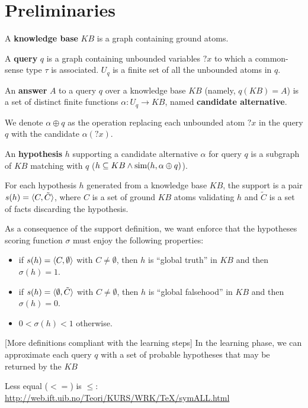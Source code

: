 \section{Preliminaries}
\begin{definition}
A \textbf{knowledge base} $KB$ is a graph containing ground atoms.
\end{definition}
\medskip

\begin{definition}[Query]
A \textbf{query} $q$ is a graph containing unbounded variables $?x$ to which a common-sense type $\tau$ is associated. $U_q$ is a finite set of all the unbounded atoms in $q$.
\end{definition}
\medskip

\begin{definition}[Answer]
An \textbf{answer} $A$ to a query $q$ over a knowledge base $KB$ (namely, $q(KB)=A$) is a set of distinct finite functions $\alpha:U_q\to KB$, named \textbf{candidate alternative}.

We denote $\alpha\oplus q$ as the operation replacing each unbounded atom $?x$ in the query $q$ with the candidate $\alpha(?x)$.
\end{definition}
\medskip

\begin{definition}[Hypothesis]
An \textbf{hypothesis} $h$ supporting a candidate alternative $\alpha$ for query $q$ is a subgraph of $KB$ matching with $q$ ($ h\subseteq KB\wedge \textup{sim}(h,\alpha\oplus q)$).
\end{definition}
\medskip

\begin{definition}[Support]
For each hypothesis $h$ generated from a knowledge base $KB$, the support is a pair $s(h)=\braket{C,\tilde{C}}$, where $C$ is a set of ground $KB$ atoms validating $h$ and $\tilde{C}$ is a set of facts discarding the hypothesis.
\end{definition}

As a consequence of the support definition, we want enforce that the hypotheses scoring function $\sigma$ must enjoy the following properties:
\begin{itemize}
\item if $s(h)=\braket{C,\emptyset}$ with $C\neq \emptyset$, then $h$ is ``global truth'' in $KB$ and then $\sigma(h)=1$.
\item if $s(h)=\braket{\emptyset, \tilde{C}}$ with $C\neq \emptyset$, then $h$ is ``global falsehood'' in $KB$ and then $\sigma(h)=0$.
\item $0<\sigma(h)<1$ otherwise.
\end{itemize}
\medskip

{\color{red}[More definitions compliant with the learning steps]} In the learning phase, we can approximate each query $q$ with a set of probable hypotheses that may be returned by the $KB$

Less equal ($<=$) is $\leq$: \url{http://web.ift.uib.no/Teori/KURS/WRK/TeX/symALL.html}